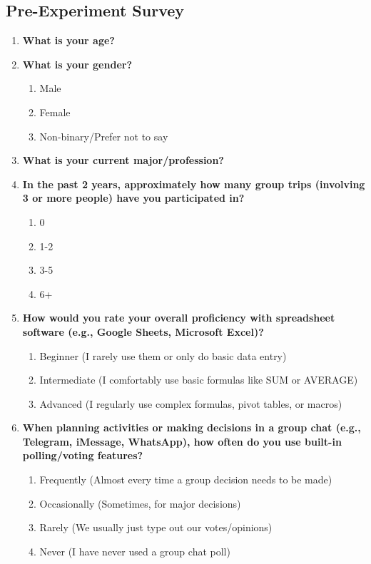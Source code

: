 \documentclass[12pt,a4paper]{article}
\begin{document}
\subsection{Pre-Experiment Survey}
\begin{enumerate}
    \item \textbf{What is your age?}

    \item {\textbf{What is your gender?}
        \begin{enumerate}
            \item Male
            \item Female
            \item Non-binary/Prefer not to say
        \end{enumerate}
        
    }

    \item \textbf{What is your current major/profession?}

    \item {\textbf{In the past 2 years, approximately how many group trips (involving 3 or more people) have you participated in?}
        \begin{enumerate}
            \item 0
            \item 1-2 
            \item 3-5
            \item 6+
        \end{enumerate}
        
    }

    \item {\textbf{How would you rate your overall proficiency with spreadsheet software (e.g., Google Sheets, Microsoft Excel)?}
        \begin{enumerate}
            \item Beginner (I rarely use them or only do basic data entry)
            \item Intermediate (I comfortably use basic formulas like SUM or AVERAGE)
            \item Advanced (I regularly use complex formulas, pivot tables, or macros)
        \end{enumerate}
        
    }

    \item {\textbf{When planning activities or making decisions in a group chat (e.g., Telegram, iMessage, WhatsApp), how often do you use built-in polling/voting features?}
        \begin{enumerate}
            \item Frequently (Almost every time a group decision needs to be made)
            \item Occasionally (Sometimes, for major decisions)
            \item Rarely (We usually just type out our votes/opinions)
            \item Never (I have never used a group chat poll)
            

\end{enumerate}}
\end{enumerate}
\end{document}
